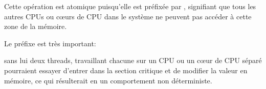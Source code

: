 Cette opération est atomique puisqu'elle est préfixée par , signifiant que
tous les autres CPUs ou c\oe urs de CPU dans le système ne peuvent pas accéder à cette
zone de la mémoire.

Le préfixe  est très important:

sans lui deux threads, travaillant chacune sur un CPU ou un c\oe ur de CPU séparé pourraient
essayer d'entrer dans la section critique et de modifier la valeur en mémoire, ce qui
résulterait en un comportement non déterministe.


